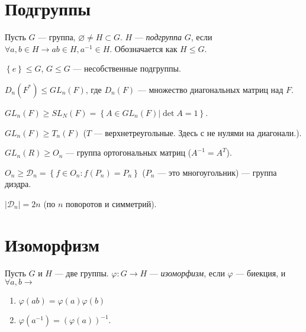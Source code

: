 \section{Подгруппы}

\begin{define*}
  Пусть $G$ --- группа, $\varnothing \neq H \subset G$. $H$ --- \emph{подгруппа} $G$, если $\forall a, b \in H \to ab \in H, a^{-1} \in H$. 
  Обозначается как $H \le G$.
\end{define*}

\begin{define*}
  $\left\{ e \right\} \le G$, $G \le G$ --- несобственные подгруппы.
\end{define*}

\begin{example}
  $D_n(F^*) \le GL_n(F)$, где $D_n(F)$ --- множество диагональных матриц над $F$.
\end{example}

\begin{example}
  $GL_n(F) \ge SL_N(F) = \left\{ A \in GL_n(F) | \det{A} = 1 \right\}$.
\end{example}

\begin{exercise}
  $GL_n(F) \ge T_n(F)$ ($T$ --- верхнетреугольные. Здесь с не нулями на диагонали.).
\end{exercise}

\begin{example}
  $GL_n(R)	\ge O_n$ --- группа ортогональных матриц ($A^{-1} = A^T$).
\end{example}

\begin{example}
  $O_n \ge \mathcal{D}_n = \left\{ f \in O_n: f(P_n) = P_n \right\}$ ($P_n$ --- это многоугольник) --- группа диэдра.
\end{example}

\begin{exercise}
  $|\mathcal{D}_n| = 2n$ (по $n$ поворотов и симметрий).
\end{exercise}

\section{Изоморфизм}

\begin{define*}
  Пусть $G$ и $H$ --- две группы. $\varphi: G\to H$ --- \emph{изоморфизм}, если $\varphi$ --- биекция, и $\forall a, b \to$
  \begin{enumerate}
	\item $\varphi(ab) = \varphi(a)\varphi(b)$
	\item $\varphi(a^{-1}) = (\varphi(a))^{-1}$.
  \end{enumerate}
\end{define*}

